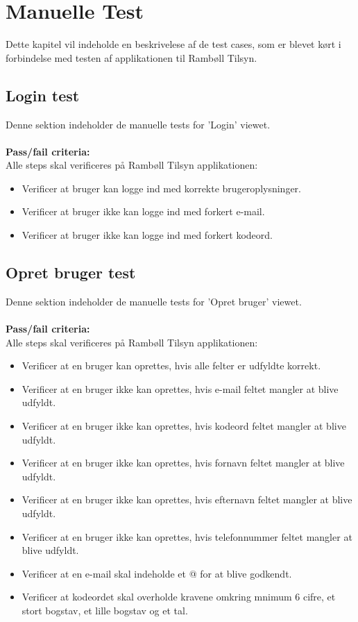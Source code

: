 \chapter{Manuelle Test} \label{sec:ManuelTest}
Dette kapitel vil indeholde en beskrivelese af de test cases, som er blevet kørt i forbindelse med testen af applikationen til Rambøll Tilsyn.

\section{Login test}
Denne sektion indeholder de manuelle tests for 'Login' viewet. \\ \\
\textbf{Pass/fail criteria:} \\
Alle steps skal verificeres på Rambøll Tilsyn applikationen:
\begin{itemize}[-]
	\item Verificer at bruger kan logge ind med korrekte brugeroplysninger.
	\item Verificer at bruger ikke kan logge ind med forkert e-mail.
	\item Verificer at bruger ikke kan logge ind med forkert kodeord. \\
\end{itemize}

\section{Opret bruger test}
Denne sektion indeholder de manuelle tests for 'Opret bruger' viewet. \\ \\
\textbf{Pass/fail criteria:} \\
Alle steps skal verificeres på Rambøll Tilsyn applikationen:
\begin{itemize}[-]
	\item Verificer at en bruger kan oprettes, hvis alle felter er udfyldte korrekt.
	\item Verificer at en bruger ikke kan oprettes, hvis e-mail feltet mangler at blive udfyldt.
	\item Verificer at en bruger ikke kan oprettes, hvis kodeord feltet mangler at blive udfyldt.
	\item Verificer at en bruger ikke kan oprettes, hvis fornavn feltet mangler at blive udfyldt.
	\item Verificer at en bruger ikke kan oprettes, hvis efternavn feltet mangler at blive udfyldt.
	\item Verificer at en bruger ikke kan oprettes, hvis telefonnummer feltet mangler at blive udfyldt.
	\item Verificer at en e-mail skal indeholde et @ for at blive godkendt.
	\item Verificer at kodeordet skal overholde kravene omkring mnimum 6 cifre, et stort bogstav, et lille bogstav og et tal.
\end{itemize}

